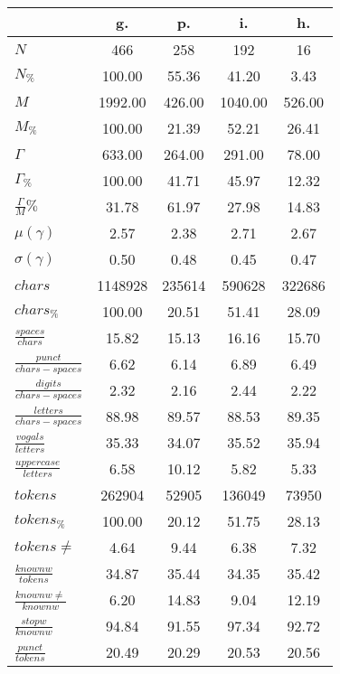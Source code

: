 \begin{table}[h!]
\begin{center}
\begin{tabular}{| l || c | c | c | c |}\hline
 & {\bf g.} & {\bf p.} & {\bf i.} & {\bf h.} \\\hline\hline
$N$ & 466  & 258  & 192  & 16 \\
$N_{\%}$ & 100.00  & 55.36  & 41.20  & 3.43 \\\hline
$M$ & 1992.00  & 426.00  & 1040.00  & 526.00 \\
$M_{\%}$ & 100.00  & 21.39  & 52.21  & 26.41 \\\hline
$\Gamma$ & 633.00  & 264.00  & 291.00  & 78.00 \\
$\Gamma_{\%}$ & 100.00  & 41.71  & 45.97  & 12.32 \\\hline
$\frac{\Gamma}{M}\%$ & 31.78  & 61.97  & 27.98  & 14.83 \\
$\mu(\gamma)$ & 2.57  & 2.38  & 2.71  & 2.67 \\
$\sigma(\gamma)$ & 0.50  & 0.48  & 0.45  & 0.47 \\\hline\hline
$chars$ & 1148928  & 235614  & 590628  & 322686 \\
$chars_{\%}$ & 100.00  & 20.51  & 51.41  & 28.09 \\\hline
$\frac{spaces}{chars}$ & 15.82  & 15.13  & 16.16  & 15.70 \\
$\frac{punct}{chars-spaces}$ & 6.62  & 6.14  & 6.89  & 6.49 \\
$\frac{digits}{chars-spaces}$ & 2.32  & 2.16  & 2.44  & 2.22 \\\hline
$\frac{letters}{chars-spaces}$ & 88.98  & 89.57  & 88.53  & 89.35 \\
$\frac{vogals}{letters}$ & 35.33  & 34.07  & 35.52  & 35.94 \\
$\frac{uppercase}{letters}$ & 6.58  & 10.12  & 5.82  & 5.33 \\\hline\hline
$tokens$ & 262904  & 52905  & 136049  & 73950 \\
$tokens_{\%}$ & 100.00  & 20.12  & 51.75  & 28.13 \\
$tokens \neq$ & 4.64  & 9.44  & 6.38  & 7.32 \\\hline
$\frac{knownw}{tokens}$ & 34.87  & 35.44  & 34.35  & 35.42 \\
$\frac{knownw \neq}{knownw}$ & 6.20  & 14.83  & 9.04  & 12.19 \\\hline
$\frac{stopw}{knownw}$ & 94.84  & 91.55  & 97.34  & 92.72 \\
$\frac{punct}{tokens}$ & 20.49  & 20.29  & 20.53  & 20.56 \\

\end{tabular}
\end{center}
\end{table}
